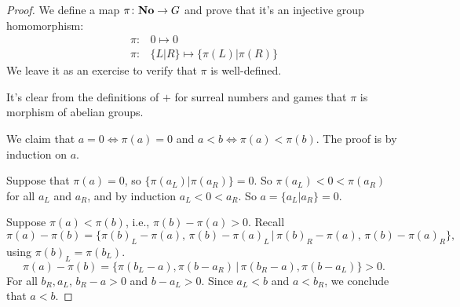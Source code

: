 \begin{proof}
We define a map $\pi\colon\mathbf{No}\to G$ and prove that it's an injective group homomorphism:
\begin{align*}
\pi \colon& 0\mapsto 0 \\
\pi\colon& \{L | R\} \mapsto \{\pi(L) | \pi(R) \}
\end{align*}
We leave it as an exercise to verify that $\pi$ is well-defined.

It's clear from the definitions of $+$ for surreal numbers and games that $\pi$ is morphism of abelian groups.

We claim that $a=0 \iff \pi(a)=0$ and $a<b\iff \pi(a)<\pi(b)$. The proof is by induction on $a$.

Suppose that $\pi(a) = 0$, so $\{ \pi(a_L) | \pi(a_R) \} = 0$. So $\pi(a_L) < 0 < \pi(a_R)$ for all $a_L$ and $a_R$, and by
induction $a_L < 0 < a_R$. So $a = \{ a_L | a_R \} = 0$.

Suppose $\pi(a)<\pi(b)$, i.e., $\pi(b)-\pi(a)>0$. Recall
\[ \pi(a)-\pi(b) = \{ \pi(b)_L - \pi(a), \, \pi(b) - \pi(a)_L \,|\, \pi(b)_R - \pi(a),\, \pi(b) - \pi(a)_R \}, \]
using $\pi(b)_L = \pi(b_L)$.
\[ \pi(a) - \pi(b) = \{ \pi(b_L-a),\pi(b-a_R) \,|\, \pi(b_R-a),\pi(b-a_L)\}>0.\]
For all $b_R,a_L$, $b_R-a>0$ and $b-a_L>0$. Since $a_L<b$ and $a<b_R$, we conclude that $a<b$.
\end{proof}